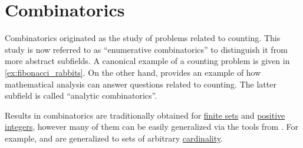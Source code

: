 \chapter{Combinatorics}\label{ch:combinatorics}

Combinatorics originated as the study of problems related to counting. This study is now referred to as \enquote{enumerative combinatorics} to distinguish it from more abstract subfields. A canonical example of a counting problem is given in \cref{ex:fibonacci_rabbits}. On the other hand,  provides an example of how mathematical analysis can answer questions related to counting. The latter subfield is called \enquote{analytic combinatorics}.

Results in combinatorics are traditionally obtained for \hyperref[def:aleph_zero_related_cardinalities]{finite sets} and \hyperref[def:integer_signum]{positive integers}, however many of them can be easily generalized via the tools from . For example,  and  are generalized to sets of arbitrary \hyperref[def:cardinality]{cardinality}.

